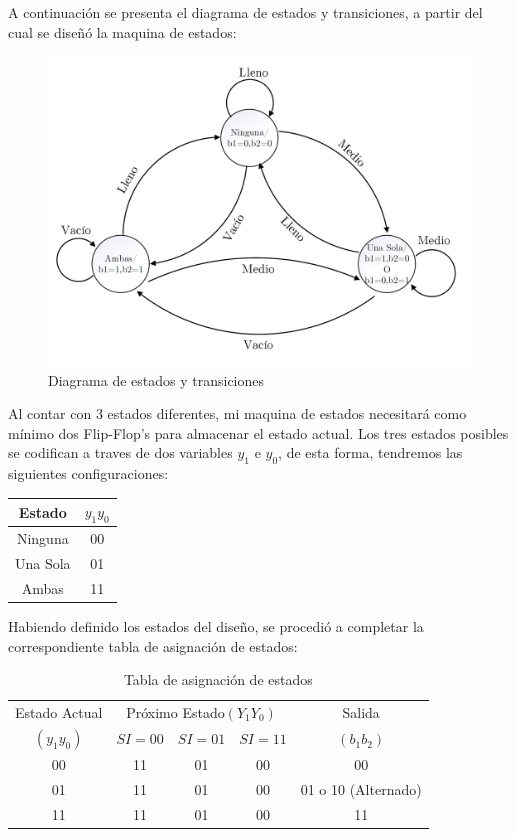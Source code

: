 A continuación se presenta el diagrama de estados y transiciones, a partir del cual se diseñó la maquina de estados:

\begin{figure}[H]
\centering
\includegraphics[scale=0.3]{images/diagrama_estados_moore.png}
\caption{Diagrama de estados y transiciones} \label{1_figa}
\end{figure}

Al contar con 3 estados diferentes, mi maquina de estados necesitará como mínimo dos Flip-Flop's para almacenar el estado actual. Los tres estados posibles se codifican a traves de dos variables $y_1$ e $y_0$, de esta forma, tendremos las siguientes configuraciones:

\bigskip

\begin{table}[ht]
	\centering
	\begin{tabular}{c|c}
	Estado & $y_1y_0$ \\ 
	\hline 
	Ninguna & 00 \\ 
	Una Sola & 01 \\ 
	Ambas & 11 \\ 
	\end{tabular} 
\end{table}


Habiendo definido los estados del diseño, se procedió a completar la correspondiente tabla de asignación de estados:
\bigskip
\begin{table}[ht]
	\centering
	\begin{tabular}{c|c|c|c|c}
	Estado Actual & \multicolumn{3}{c|}{Próximo Estado$(Y_1Y_0)$} & Salida\\
	\cline{2-4}
	$(y_1y_0)$ & $SI=00$ & $SI=01$ & $SI=11$ & $(b_1b_2)$\\
	\hline
	00 & 11 & 01 & 00 & 00 \\
	01 & 11 & 01 & 00 & 01 o 10 (Alternado) \\
	11 & 11 & 01 & 00 & 11 \\
	\end{tabular}
	\caption{Tabla de asignación de estados}
	\label{1_t1}
\end{table}

